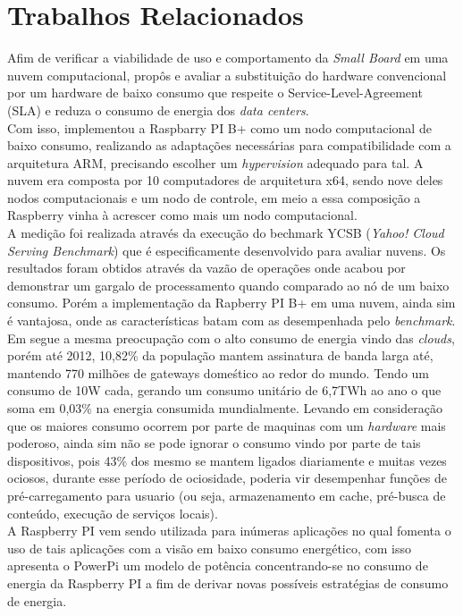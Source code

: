 \documentclass[12pt]{article}
\begin{document}
\section{Trabalhos Relacionados}
  Afim de verificar a viabilidade de uso e comportamento da \textit{Small Board} em uma nuvem computacional, \cite{Joao} propôs e avaliar a substituição do hardware convencional por um hardware de baixo consumo que respeite o Service-Level-Agreement (SLA) e reduza o consumo de energia dos \textit{data centers}.\\
  Com isso, implementou a Raspbarry PI B+ como um nodo computacional de baixo consumo, realizando as adaptações necessárias para compatibilidade com a arquitetura ARM, precisando escolher um \textit{hypervision} adequado para tal. A nuvem era composta por 10 computadores de arquitetura x64, sendo nove deles nodos computacionais e um nodo de controle, em meio a essa composição a Raspberry vinha à acrescer como mais um nodo computacional.\\
  A medição foi realizada através da execução do bechmark YCSB (\textit{Yahoo! Cloud Serving Benchmark}) que é especificamente desenvolvido para avaliar nuvens. Os resultados foram obtidos através da vazão de operações onde acabou por demonstrar um gargalo de processamento quando comparado ao nó de um baixo consumo. Porém a implementação da Rapberry PI B+ em uma nuvem, ainda sim é vantajosa, onde as características batam com as desempenhada pelo \textit{benchmark}.\\
  Em \cite{PiConsumo} segue a mesma preocupação com o alto consumo de energia vindo das \textit{clouds}, porém até 2012, 10,82\% da população mantem assinatura de banda larga até, mantendo 770 milhões de gateways domeśtico ao redor do mundo. Tendo um consumo de 10W cada, gerando um consumo unitário de 6,7TWh ao ano o que soma em 0,03\% na energia consumida mundialmente. Levando em consideração que os maiores consumo ocorrem por parte de maquinas com um \textit{hardware} mais poderoso, ainda sim não se pode ignorar o consumo vindo por parte de tais dispositivos, pois 43\% dos mesmo se mantem ligados diariamente e muitas vezes ociosos, durante esse período de ociosidade, poderia vir desempenhar funções de pré-carregamento para usuario (ou seja, armazenamento em cache, pré-busca de conteúdo, execução de serviços locais).\\
  A Raspberry PI vem sendo utilizada para inúmeras aplicações no qual fomenta o uso de tais aplicações com a visão em baixo consumo energético, com isso \cite{PiConsumo} apresenta o PowerPi um modelo de  potência concentrando-se no consumo de energia da Raspberry PI a fim de derivar novas possíveis estratégias de consumo de energia.\\
\end{document}
